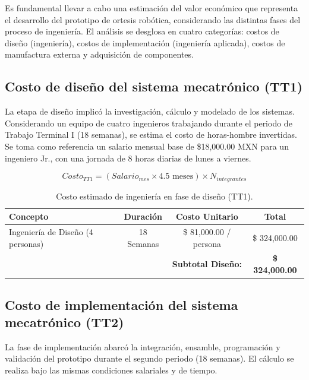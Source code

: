\label{sec:analisis_costos}
Es fundamental llevar a cabo una estimación del valor económico que representa el desarrollo del prototipo de ortesis robótica, considerando las distintas fases del proceso de ingeniería. El análisis se desglosa en cuatro categorías: costos de diseño (ingeniería), costos de implementación (ingeniería aplicada), costos de manufactura externa y adquisición de componentes.
\subsection{Costo de diseño del sistema mecatrónico (TT1)}
La etapa de diseño implicó la investigación, cálculo y modelado de los sistemas. Considerando un equipo de cuatro ingenieros trabajando durante el periodo de Trabajo Terminal I (18 semanas), se estima el costo de horas-hombre invertidas.
Se toma como referencia un salario mensual base de \$18,000.00 MXN para un ingeniero Jr., con una jornada de 8 horas diarias de lunes a viernes.

\begin{equation}
    Costo_{TT1} = (Salario_{mes} \times 4.5 \text{ meses}) \times N_{integrantes}
\end{equation}

\begin{table}[h!]
	\centering
	\caption{Costo estimado de ingeniería en fase de diseño (TT1).}
	\label{tab:costo_ingenieria_tt1}
	\begin{tabular}{|l|c|c|c|}
		\hline
		\rowcolor[HTML]{C5D9F1} 
		\textbf{Concepto} & \textbf{Duración} & \textbf{Costo Unitario} & \textbf{Total} \\ \hline
		Ingeniería de Diseño (4 personas) & 18 Semanas & \$ 81,000.00 / persona & \$ 324,000.00 \\ \hline
		\multicolumn{3}{|r|}{\textbf{Subtotal Diseño:}} & \textbf{\$ 324,000.00} \\ \hline
	\end{tabular}
\end{table}

\subsection{Costo de implementación del sistema mecatrónico (TT2)}

La fase de implementación abarcó la integración, ensamble, programación y validación del prototipo durante el segundo periodo (18 semanas). El cálculo se realiza bajo las mismas condiciones salariales y de tiempo.

